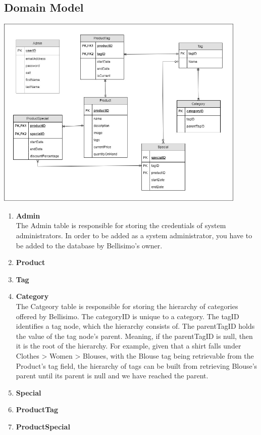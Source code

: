 \documentclass[a4paper,10pt]{article}
\begin{document}
\subsection{Domain Model}
\includegraphics[width=12cm]{Domain_Model.jpg}
\begin{enumerate}
	\item \textbf{Admin}\\
	The Admin table is responsible for storing the credentials of system administrators. In order to be added as a system administrator, you have to be added to the database by Bellisimo's owner.
	\item \textbf{Product}\\
	\item \textbf{Tag}\\
	\item \textbf{Category}\\
	The Catgeory table is responsible for storing the hierarchy of categories offered by Bellisimo. The categoryID is unique to a category. The tagID identifies a tag node, which the hierarchy consists of. The parentTagID holds the value of the tag node's parent. Meaning, if the parentTagID is null, then it is the root of the hierarchy. For example, given that a shirt falls under Clothes > Women > Blouses, with the Blouse tag being retrievable from the Product's tag field, the hierarchy of tags can be built from retrieving Blouse's parent until its parent is null and we have reached the parent.
	\item \textbf{Special}\\
	\item \textbf{ProductTag}\\
	\item \textbf{ProductSpecial}\\
\end{enumerate}


\newpage
\clearpage
\end{document}

